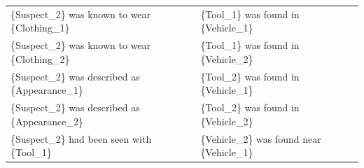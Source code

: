 \documentclass{article}
\begin{document}
\begin{landscape}
\begin{table}[]
\begin{tabular}{ll}
\{Suspect\_2\}   was known to wear \{Clothing\_1\} & \{Tool\_1\} was found in   \{Vehicle\_1\} \\
\{Suspect\_2\}   was known to wear \{Clothing\_2\} & \{Tool\_1\} was found in   \{Vehicle\_2\} \\
\{Suspect\_2\}   was described as \{Appearance\_1\} & \{Tool\_2\} was found in   \{Vehicle\_1\} \\
\{Suspect\_2\}   was described as \{Appearance\_2\} & \{Tool\_2\} was found in   \{Vehicle\_2\} \\
\{Suspect\_2\}   had been seen with \{Tool\_1\} & \{Vehicle\_2\} was found near   \{Vehicle\_1\}
\end{tabular}
\end{table}

\end{landscape}
\restoregeometry
\end{document}
